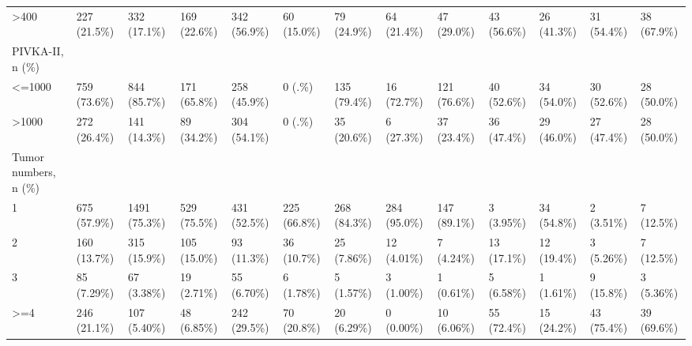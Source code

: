 \begin{landscape}
\begin{center}
\begin{longtable}{p{6.0cm}p{3.0cm}p{3.0cm}p{3.0cm}p{3.0cm}p{3.0cm}p{3.0cm}p{3.0cm}p{3.0cm}p{3.0cm}p{3.0cm}p{3.0cm}p{3.0cm}}
    >400 &   227 (21.5\%)    &   332 (17.1\%)    &   169 (22.6\%)    &   342 (56.9\%)    &    60 (15.0\%)    &    79 (24.9\%)    &    64 (21.4\%)    &    47 (29.0\%)    &    43 (56.6\%)    &    26 (41.3\%)    &    31 (54.4\%)    &    38 (67.9\%)    \\
PIVKA-II, n (\%) &                  &                  &                  &                  &                  &                  &                  &                  &                  &                  &                  &                  \\
    <=1000 &   759 (73.6\%)    &   844 (85.7\%)    &   171 (65.8\%)    &   258 (45.9\%)    &      0 (.\%)      &   135 (79.4\%)    &    16 (72.7\%)    &   121 (76.6\%)    &    40 (52.6\%)    &    34 (54.0\%)    &    30 (52.6\%)    &    28 (50.0\%)    \\
    >1000 &   272 (26.4\%)    &   141 (14.3\%)    &    89 (34.2\%)    &   304 (54.1\%)    &      0 (.\%)      &    35 (20.6\%)    &    6 (27.3\%)     &    37 (23.4\%)    &    36 (47.4\%)    &    29 (46.0\%)    &    27 (47.4\%)    &    28 (50.0\%)    \\
Tumor numbers, n (\%) &                  &                  &                  &                  &                  &                  &                  &                  &                  &                  &                  &                  \\
    1 &   675 (57.9\%)    &   1491 (75.3\%)   &   529 (75.5\%)    &   431 (52.5\%)    &   225 (66.8\%)    &   268 (84.3\%)    &   284 (95.0\%)    &   147 (89.1\%)    &    3 (3.95\%)     &    34 (54.8\%)    &    2 (3.51\%)     &    7 (12.5\%)     \\
    2 &   160 (13.7\%)    &   315 (15.9\%)    &   105 (15.0\%)    &    93 (11.3\%)    &    36 (10.7\%)    &    25 (7.86\%)    &    12 (4.01\%)    &    7 (4.24\%)     &    13 (17.1\%)    &    12 (19.4\%)    &    3 (5.26\%)     &    7 (12.5\%)     \\
    3 &    85 (7.29\%)    &    67 (3.38\%)    &    19 (2.71\%)    &    55 (6.70\%)    &    6 (1.78\%)     &    5 (1.57\%)     &    3 (1.00\%)     &    1 (0.61\%)     &    5 (6.58\%)     &    1 (1.61\%)     &    9 (15.8\%)     &    3 (5.36\%)     \\
    >=4 &   246 (21.1\%)    &   107 (5.40\%)    &    48 (6.85\%)    &   242 (29.5\%)    &    70 (20.8\%)    &    20 (6.29\%)    &    0 (0.00\%)     &    10 (6.06\%)    &    55 (72.4\%)    &    15 (24.2\%)    &    43 (75.4\%)    &    39 (69.6\%)    \\

\end{longtable}
\end{center}
\end{landscape}
